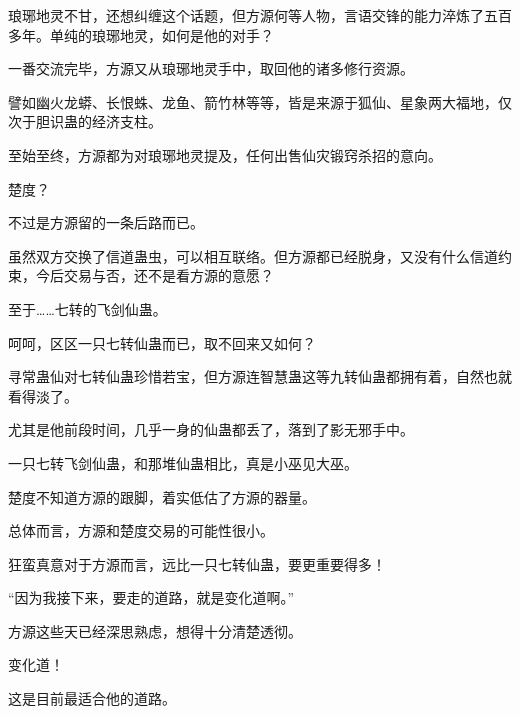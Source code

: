 \begin{this_body}
琅琊地灵不甘，还想纠缠这个话题，但方源何等人物，言语交锋的能力淬炼了五百多年。单纯的琅琊地灵，如何是他的对手？

一番交流完毕，方源又从琅琊地灵手中，取回他的诸多修行资源。

譬如幽火龙蟒、长恨蛛、龙鱼、箭竹林等等，皆是来源于狐仙、星象两大福地，仅次于胆识蛊的经济支柱。

至始至终，方源都为对琅琊地灵提及，任何出售仙灾锻窍杀招的意向。

楚度？

不过是方源留的一条后路而已。

虽然双方交换了信道蛊虫，可以相互联络。但方源都已经脱身，又没有什么信道约束，今后交易与否，还不是看方源的意愿？

至于……七转的飞剑仙蛊。

呵呵，区区一只七转仙蛊而已，取不回来又如何？

寻常蛊仙对七转仙蛊珍惜若宝，但方源连智慧蛊这等九转仙蛊都拥有着，自然也就看得淡了。

尤其是他前段时间，几乎一身的仙蛊都丢了，落到了影无邪手中。

一只七转飞剑仙蛊，和那堆仙蛊相比，真是小巫见大巫。

楚度不知道方源的跟脚，着实低估了方源的器量。

总体而言，方源和楚度交易的可能性很小。

狂蛮真意对于方源而言，远比一只七转仙蛊，要更重要得多！

“因为我接下来，要走的道路，就是变化道啊。”

方源这些天已经深思熟虑，想得十分清楚透彻。

变化道！

这是目前最适合他的道路。

\end{this_body}

